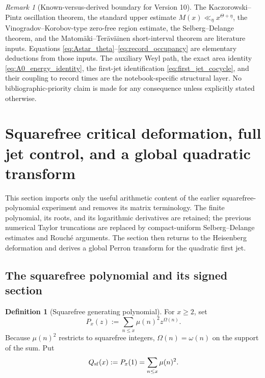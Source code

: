 \documentclass[11pt]{amsart}
\numberwithin{equation}{section}
\theoremstyle{plain}
\theoremstyle{definition}
\newtheorem{definition}[theorem]{Definition}
\theoremstyle{remark}
\newtheorem{remark}[theorem]{Remark}
\begin{document}
\begin{remark}[Known-versus-derived boundary for Version 10]
\label{rem:v10_known_derived_boundary}
The Kaczorowski--Pintz oscillation theorem, the standard upper estimate
\(M(x)\ll_\eta x^{\Theta+\eta}\), the Vinogradov--Korobov-type zero-free
region estimate, the Selberg--Delange theorem, and the Matom\"aki--Ter\"av\"ainen
short-interval theorem are literature inputs.  Equations
\eqref{eq:Astar_theta}--\eqref{eq:record_occupancy} are elementary deductions
from those inputs.  The auxiliary Weyl path, the exact area identity
\eqref{eq:A0_energy_identity}, the first-jet identification
\eqref{eq:first_jet_cocycle}, and their coupling to record times are the
notebook-specific structural layer.  No bibliographic-priority claim is made
for any consequence unless explicitly stated otherwise.
\end{remark}



\section{Squarefree critical deformation, full jet control, and a global quadratic transform}
\label{sec:v11_squarefree_critical_global}

This section imports only the useful arithmetic content of the earlier
squarefree-polynomial experiment and removes its matrix terminology.  The
finite polynomial, its roots, and its logarithmic derivatives are retained;
the previous numerical Taylor truncations are replaced by compact-uniform
Selberg--Delange estimates and Rouch\'e arguments.  The section then returns
to the Heisenberg deformation and derives a global Perron transform for the
quadratic first jet.

\subsection{The squarefree polynomial and its signed section}
\label{subsec:v11_squarefree_polynomial}

\begin{definition}[Squarefree generating polynomial]
\label{def:v11_Px}
For \(x\ge2\), set
\begin{equation}
P_x(z):=\sum_{n\le x}\mu(n)^2z^{\Omega(n)}.
\label{eq:v11_Px}
\end{equation}
Because \(\mu(n)^2\) restricts to squarefree integers, \(\Omega(n)=\omega(n)\)
on the support of the sum.  Put
\begin{equation}
Q_{\rm sf}(x):=P_x(1)=\sum_{n\le x}\mu(n)^2.
\label{eq:v11_Qsf}
\end{equation}
\end{definition}
\end{document}
